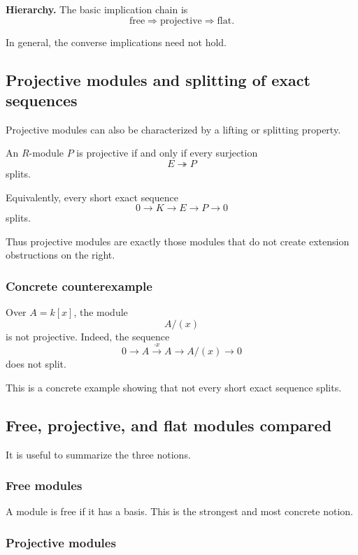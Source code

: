 \documentclass[12pt,a4paper]{article}
\theoremstyle{notespace}
\theoremstyle{definition}
\begin{document}
\medskip

\textbf{Hierarchy.}
The basic implication chain is
\[
\text{free} \Longrightarrow \text{projective} \Longrightarrow \text{flat}.
\]

In general, the converse implications need not hold.

\subsection{ Projective modules and splitting of exact sequences}

Projective modules can also be characterized by a lifting or splitting property.

An \(R\)-module \(P\) is projective if and only if every surjection
\[
E \twoheadrightarrow P
\]
splits.

Equivalently, every short exact sequence
\[
0 \longrightarrow K \longrightarrow E \longrightarrow P \longrightarrow 0
\]
splits.

Thus projective modules are exactly those modules that do not create extension obstructions on the right.

\subsubsection*{Concrete counterexample}

Over \(A=k[x]\), the module
\[
A/(x)
\]
is not projective.
Indeed, the sequence
\[
0 \longrightarrow A \xrightarrow{\cdot x} A \longrightarrow A/(x) \longrightarrow 0
\]
does not split.

This is a concrete example showing that not every short exact sequence splits.

\subsection{ Free, projective, and flat modules compared}

It is useful to summarize the three notions.

\subsubsection*{Free modules}

A module is free if it has a basis.
This is the strongest and most concrete notion.

\subsubsection*{Projective modules}
\end{document}

